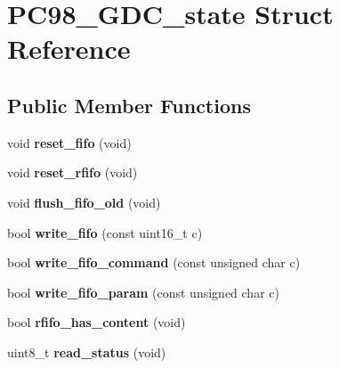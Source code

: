 \hypertarget{structPC98__GDC__state}{\section{P\-C98\-\_\-\-G\-D\-C\-\_\-state Struct Reference}
\label{structPC98__GDC__state}
}
\subsection*{Public Member Functions}
\begin{DoxyCompactItemize}
\item 
\hypertarget{structPC98__GDC__state_a7973469db8c58471cd105cc5f2513bb1}{void {\bfseries reset\-\_\-fifo} (void)}\label{structPC98__GDC__state_a7973469db8c58471cd105cc5f2513bb1}

\item 
\hypertarget{structPC98__GDC__state_a4836b9d30ad97c0d491c628c493a31a3}{void {\bfseries reset\-\_\-rfifo} (void)}\label{structPC98__GDC__state_a4836b9d30ad97c0d491c628c493a31a3}

\item 
\hypertarget{structPC98__GDC__state_a0eab727dd82dfad6c340daaa337f442d}{void {\bfseries flush\-\_\-fifo\-\_\-old} (void)}\label{structPC98__GDC__state_a0eab727dd82dfad6c340daaa337f442d}

\item 
\hypertarget{structPC98__GDC__state_af404e360236ebfe30003bd00761e7eb1}{bool {\bfseries write\-\_\-fifo} (const uint16\-\_\-t c)}\label{structPC98__GDC__state_af404e360236ebfe30003bd00761e7eb1}

\item 
\hypertarget{structPC98__GDC__state_a19867db16d1d33edb3cec74c9c8596cd}{bool {\bfseries write\-\_\-fifo\-\_\-command} (const unsigned char c)}\label{structPC98__GDC__state_a19867db16d1d33edb3cec74c9c8596cd}

\item 
\hypertarget{structPC98__GDC__state_aedfc62f64c943388975adedbc30458bf}{bool {\bfseries write\-\_\-fifo\-\_\-param} (const unsigned char c)}\label{structPC98__GDC__state_aedfc62f64c943388975adedbc30458bf}

\item 
\hypertarget{structPC98__GDC__state_ad34b46692e4fe7b2bc059509a5b465af}{bool {\bfseries rfifo\-\_\-has\-\_\-content} (void)}\label{structPC98__GDC__state_ad34b46692e4fe7b2bc059509a5b465af}

\item 
\hypertarget{structPC98__GDC__state_af5efa59d1f87f1a172c4fd86e0367ab0}{uint8\-\_\-t {\bfseries read\-\_\-status} (void)}\label{structPC98__GDC__state_af5efa59d1f87f1a172c4fd86e0367ab0}


\end{DoxyCompactItemize}
